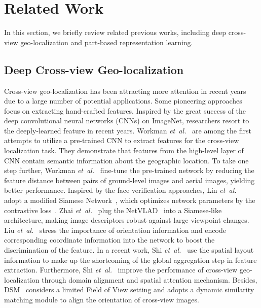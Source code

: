 \documentclass[journal]{IEEEtran}
\def\etal{\emph{et~al.}}
\begin{document}
\section{Related Work}\label{related_work}
In this section, we briefly review related previous works, including deep cross-view geo-localization and part-based representation learning.

\subsection{Deep Cross-view Geo-localization}
Cross-view geo-localization has been attracting more attention in recent years due to a large number of potential applications. Some pioneering approaches~\cite{SemanticCM,lin2013cross,senlet2011framework,bansal2011geo} focus on extracting hand-crafted features. Inspired by the great success of the deep convolutional neural networks (CNNs) on ImageNet, researchers resort to the deeply-learned feature in recent years. 
Workman \etal~\cite{workman_location_2015} are among the first attempts to utilize a pre-trained CNN to extract features for the cross-view localization task. They demonstrate that features from the high-level layer of CNN contain semantic information about the geographic location. To take one step further, Workman \etal ~\cite{workman_wide-area_2015} fine-tune the pre-trained network by reducing the feature distance between pairs of ground-level images and aerial images, yielding better performance. 
Inspired by the face verification approaches, Lin \etal~\cite{lin_learning_2015} adopt a modified Siamese Network~\cite{chopra2005learning}, which optimizes network parameters by the contrastive loss~\cite{hadsell2006dimensionality,deng2018image}. 
Zhai \etal~\cite{hu_cvm-net_2018} plug the NetVLAD~\cite{arandjelovic2016netvlad} into a Siamese-like architecture, making image descriptors robust against large viewpoint changes. 
Liu \etal~\cite{liu_lending_2019} stress the importance of orientation information and encode corresponding coordinate information into the network to boost the discrimination of the feature. 
In a recent work, Shi \etal~\cite{shi_optimal_nodate} use the spatial layout information to make up the shortcoming of the global aggregation step in feature extraction. Furthermore, Shi \etal~\cite{shi_spatial-aware_nodate} improve the performance of cross-view geo-localization through domain alignment and spatial attention mechanism. Besides, DSM~\cite{Shi_2020_CVPR} considers a limited Field of View setting and adopts a dynamic similarity matching module to align the orientation of cross-view images. 
\end{document}
